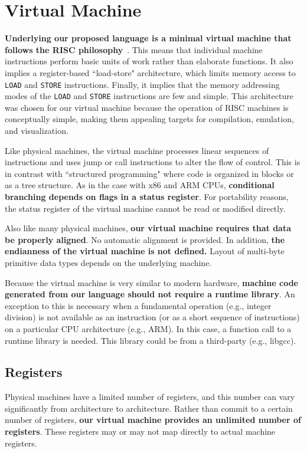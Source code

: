 \section{Virtual Machine}

\textbf{Underlying our proposed language is a
minimal virtual machine that follows the RISC philosophy}~\cite{patterson1985reduced}.
This means that individual machine instructions
perform basic units of work rather than elaborate functions.
It also implies a register-based ``load-store" architecture,
which limits memory access to \texttt{LOAD} and \texttt{STORE} instructions.
Finally, it implies that the memory addressing modes of the \texttt{LOAD} and
\texttt{STORE} instructions are few and simple. This architecture was chosen
for our virtual machine because the operation of
RISC machines is conceptually simple, making them
appealing targets for compilation, emulation, and visualization.

Like physical machines, the virtual machine processes
linear sequences of instructions and uses jump or call instructions
to alter the flow of control. This is in contrast with ``structured programming"
where code is organized in blocks or as a tree structure.
As in the case with x86 and ARM CPUs, \textbf{conditional branching depends on flags in
a status register}. For portability reasons, the status register
of the virtual machine cannot be read or modified directly.

Also like many physical machines, \textbf{our virtual machine requires that data be
properly aligned}. No automatic alignment is provided.
In addition, \textbf{the endianness of the virtual machine is not defined.}
Layout of multi-byte primitive data types depends on the underlying machine.

Because the virtual machine is very similar to modern hardware,
\textbf{machine code generated from our language should not require a
runtime library}. An exception to this is necessary when a fundamental operation
(e.g., integer division) is not available as an instruction (or as a short
sequence of instructions) on a particular CPU architecture (e.g., ARM).
In this case, a function call to a runtime library is needed.
This library could be from a third-party (e.g., libgcc).

\subsection{Registers}

Physical machines have a limited number of registers, and this number
can vary significantly from architecture to architecture.
Rather than commit to a certain number of registers, \textbf{our virtual
machine provides an unlimited number of registers}. These registers
may or may not map directly to actual machine registers.

